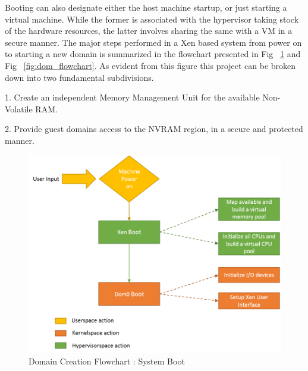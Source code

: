 Booting can also designate either the host machine startup, or just starting a virtual machine. While the former is associated with the hypervisor taking stock of the hardware resources, the latter involves sharing the same with a VM in a secure manner. The major steps performed in a Xen based system from power on to starting a new domain is summarized in the flowchart presented in Fig ~\ref{fig:xen_flowchart} and Fig ~\ref{fig:dom_flowchart}. As evident from this figure this project can be broken down into two fundamental subdivisions.

1. Create an independent Memory Management Unit for the available Non-Volatile RAM.

2. Provide guest domains access to the NVRAM region, in a secure and protected manner. 


\begin{figure}[h]
\centering
\includegraphics[scale=0.9]{figures/domain_creation1.png}
\caption{Domain Creation Flowchart : System Boot}
\label{fig:xen_flowchart}
\end{figure}


